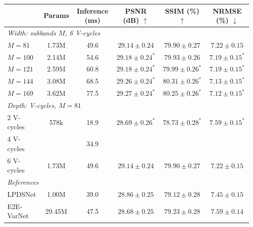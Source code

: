 \begin{tabular}{lccccc}
\toprule
 & Params & Inference (ms) & PSNR (dB) $\uparrow$ & SSIM (\%) $\uparrow$ & NRMSE (\%) $\downarrow$ \\
\midrule
\multicolumn{6}{l}{\textit{Width: subbands $M$, 6 V-cycles}} \\
$M{=}81$  & 1.73M & 49.6 & $29.14 \pm 0.24$ & $79.90 \pm 0.27$ & $7.22 \pm 0.15$ \\
$M{=}100$ & 2.14M & 54.6 & $29.18 \pm 0.24^{*}$ & $79.93 \pm 0.26$ & $7.19 \pm 0.15^{*}$ \\
$M{=}121$ & 2.59M & 60.8 & $29.18 \pm 0.24^{*}$ & $79.99 \pm 0.26^{*}$ & $7.19 \pm 0.15^{*}$ \\
$M{=}144$ & 3.08M & 68.5 & $29.26 \pm 0.24^{*}$ & $\mathbf{80.31} \pm 0.26^{*}$ & $7.13 \pm 0.15^{*}$ \\
$M{=}169$ & 3.62M & 77.5 & $\mathbf{29.27} \pm 0.24^{*}$ & $80.25 \pm 0.26^{*}$ & $\mathbf{7.12} \pm 0.15^{*}$ \\
\midrule
\multicolumn{6}{l}{\textit{Depth: V-cycles, $M{=}81$}} \\
2 V-cycles & 578k  & 18.9 & $28.69 \pm 0.26^{*}$ & $78.73 \pm 0.28^{*}$ & $7.59 \pm 0.15^{*}$ \\
4 V-cycles & \todo{--} & 34.9 & \todo{--} & \todo{--} & \todo{--} \\
6 V-cycles & 1.73M & 49.6 & $\mathbf{29.14} \pm 0.24$ & $\mathbf{79.90} \pm 0.27$ & $\mathbf{7.22} \pm 0.15$ \\
\midrule
\multicolumn{6}{l}{\textit{References}} \\
LPDSNet    & 1.00M  & 39.0 & $28.86 \pm 0.25$ & $79.12 \pm 0.28$ & $7.45 \pm 0.15$ \\
E2E-VarNet & 29.45M & 47.5 & $28.68 \pm 0.25$ & $79.23 \pm 0.28$ & $7.59 \pm 0.14$ \\
\bottomrule
\end{tabular}
